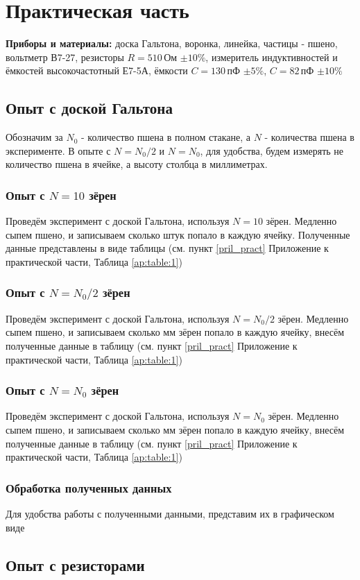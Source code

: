 \section{Практическая часть}

\textbf{Приборы и материалы:} доска Гальтона, воронка, линейка, частицы - пшено, вольтметр В7-27, резисторы $R = 510\,$Ом $\pm10\%$, измеритель индуктивностей и ёмкостей высокочастотный Е7-5А, ёмкости $ C = 130\,$пФ $\pm5\%$, $C = 82\,$пФ $\pm10\%$

\subsection{Опыт с доской Гальтона}

Обозначим за $N_0$ - количество пшена в полном стакане, а $N$ - количества пшена в эксперименте. В опыте с $N = N_0 / 2$ и $N = N_0$, для удобства, будем измерять не количество пшена в ячейке, а высоту столбца в миллиметрах.
	
\subsubsection{Опыт с $N = 10$ зёрен}

Проведём эксперимент с доской Гальтона, используя $N = 10$ зёрен. Медленно сыпем пшено, и записываем сколько штук попало в каждую ячейку. Полученные данные представлены в виде таблицы (см. пункт \ref{pril_pract} Приложение к практической части, Таблица \ref{ap:table:1})

\subsubsection{Опыт с $N = N_0 / 2$ зёрен}

Проведём эксперимент с доской Гальтона, используя $N = N_0 / 2$ зёрен. Медленно сыпем пшено, и записываем сколько мм зёрен попало в каждую ячейку, внесём полученные данные в таблицу (см. пункт \ref{pril_pract} Приложение к практической части, Таблица \ref{ap:table:1})


\subsubsection{Опыт с $N = N_0$ зёрен} 

Проведём эксперимент с доской Гальтона, используя $N = N_0$ зёрен. Медленно сыпем пшено, и записываем сколько мм зёрен попало в каждую ячейку, внесём полученные данные в таблицу (см. пункт \ref{pril_pract} Приложение к практической части, Таблица \ref{ap:table:1})

\subsubsection{Обработка полученных данных}

Для удобства работы с полученными данными, представим их в графическом виде

\subsection{Опыт с резисторами}

